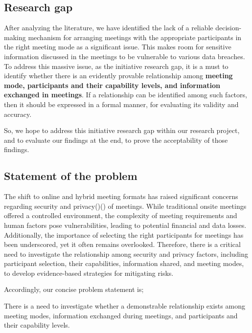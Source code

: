 \begin{spacing}{1.0}
    \subsection{Research gap}
    \indent \par After analyzing the literature, we have identified the lack of a reliable decision-making mechanism for arranging meetings with the appropriate participants in the right meeting mode as a significant issue. This makes room for sensitive information discussed in the meetings to be vulnerable to various data breaches. To address this massive issue, as the initiative research gap, it is a must to identify whether there is an evidently provable relationship among \textbf{meeting mode, participants and their capability levels, and information exchanged in meetings}. If a relationship can be identified among such factors, then it should be expressed in a formal manner, for evaluating its validity and accuracy. 
    \par So, we hope to address this initiative research gap within our research project, and to evaluate our findings at the end, to prove the acceptability of those findings.

    \subsection{Statement of the problem}
    \indent \par The shift to online and hybrid meeting formats has raised significant concerns regarding security and privacy(\cite{jo2021})(\cite{bispham2021}) of meetings. While traditional onsite meetings offered a controlled environment, the complexity of meeting requirements and human factors pose vulnerabilities, leading to potential financial and data losses. Additionally, the importance of selecting the right participants for meetings has been underscored, yet it often remains overlooked. Therefore, there is a critical need to investigate the relationship among security and privacy factors, including participant selection, their capabilities, information shared, and meeting modes, to develop evidence-based strategies for mitigating risks.
    \par Accordingly, our concise problem statement is;
    \par There is a need to investigate whether a demonstrable relationship exists among meeting modes, information exchanged during meetings, and participants and their capability levels.



\end{spacing}
